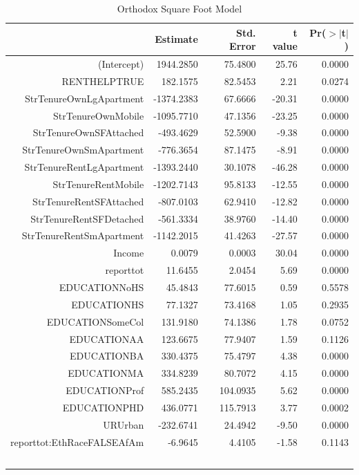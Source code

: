 \documentclass{article}
\begin{document}
{\small
\begin{longtable}{rrrrr}
\caption{Orthodox Square Foot Model} \\ 
  \hline
 & Estimate & Std. Error & t value & Pr($>$$|$t$|$) \\ 
  \hline
(Intercept) & 1944.2850 & 75.4800 & 25.76 & 0.0000 \\ 
  RENTHELPTRUE & 182.1575 & 82.5453 & 2.21 & 0.0274 \\ 
  StrTenureOwnLgApartment & -1374.2383 & 67.6666 & -20.31 & 0.0000 \\ 
  StrTenureOwnMobile & -1095.7710 & 47.1356 & -23.25 & 0.0000 \\ 
  StrTenureOwnSFAttached & -493.4629 & 52.5900 & -9.38 & 0.0000 \\ 
  StrTenureOwnSmApartment & -776.3654 & 87.1475 & -8.91 & 0.0000 \\ 
  StrTenureRentLgApartment & -1393.2440 & 30.1078 & -46.28 & 0.0000 \\ 
  StrTenureRentMobile & -1202.7143 & 95.8133 & -12.55 & 0.0000 \\ 
  StrTenureRentSFAttached & -807.0103 & 62.9410 & -12.82 & 0.0000 \\ 
  StrTenureRentSFDetached & -561.3334 & 38.9760 & -14.40 & 0.0000 \\ 
  StrTenureRentSmApartment & -1142.2015 & 41.4263 & -27.57 & 0.0000 \\ 
  Income & 0.0079 & 0.0003 & 30.04 & 0.0000 \\ 
  reporttot & 11.6455 & 2.0454 & 5.69 & 0.0000 \\ 
  EDUCATIONNoHS & 45.4843 & 77.6015 & 0.59 & 0.5578 \\ 
  EDUCATIONHS & 77.1327 & 73.4168 & 1.05 & 0.2935 \\ 
  EDUCATIONSomeCol & 131.9180 & 74.1386 & 1.78 & 0.0752 \\ 
  EDUCATIONAA & 123.6675 & 77.9407 & 1.59 & 0.1126 \\ 
  EDUCATIONBA & 330.4375 & 75.4797 & 4.38 & 0.0000 \\ 
  EDUCATIONMA & 334.8239 & 80.7072 & 4.15 & 0.0000 \\ 
  EDUCATIONProf & 585.2435 & 104.0935 & 5.62 & 0.0000 \\ 
  EDUCATIONPHD & 436.0771 & 115.7913 & 3.77 & 0.0002 \\ 
  URUrban & -232.6741 & 24.4942 & -9.50 & 0.0000 \\ 
  reporttot:EthRaceFALSEAfAm & -6.9645 & 4.4105 & -1.58 & 0.1143 \\ 
$$
\end{longtable}}
\end{document}
